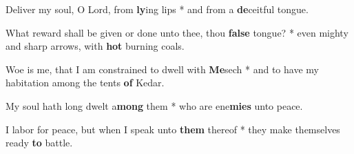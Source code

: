 \begin{multicols}{2}
	Deliver my soul, O Lord, from \textbf{ly}ing lips * and from a \textbf{de}ceitful tongue.
	
	What reward shall be given or done unto thee, thou \textbf{false} tongue? * even mighty and sharp arrows, with \textbf{hot} burning coals.
	
	Woe is me, that I am constrained to dwell with \textbf{Me}sech * and to have my habitation among the tents \textbf{of} Kedar.
	
	My soul hath long dwelt a\textbf{mong} them * who are ene\textbf{mies} unto peace.
	
	I labor for peace, but when I speak unto \textbf{them} thereof * they make themselves ready \textbf{to} battle.
\end{multicols}